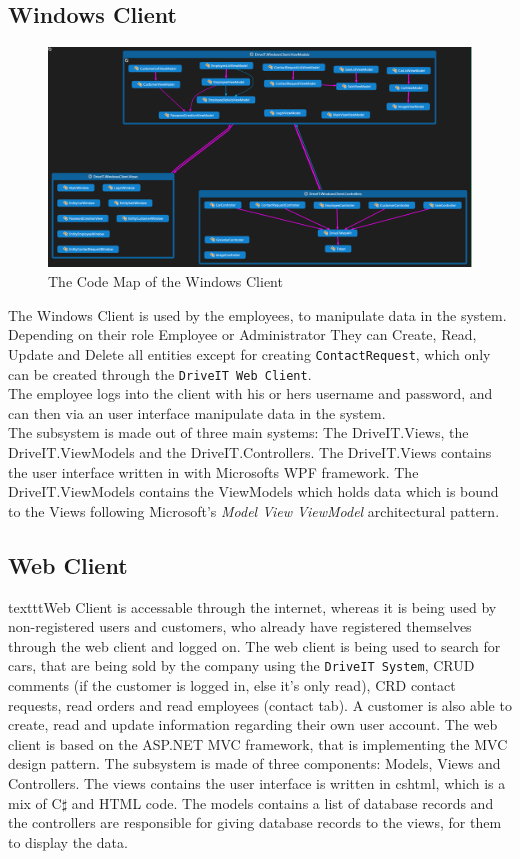 \subsection{Windows Client} 
\begin{figure}[H]
	\centering
	\includegraphics[scale=0.35]{Figures/WindowsClientCodeMap}
	\caption{The Code Map of the Windows Client}
	\label{fig:WindowsClientCodeMap}
\end{figure}
The Windows Client is used by the employees, to manipulate data in the system. Depending on their role Employee or Administrator They can Create, Read, Update and Delete all entities except for creating \texttt{ContactRequest}, which only can be created through the \texttt{DriveIT Web Client}.\\
The employee logs into the client with his or hers username and password, and can then via an user interface manipulate data in the system.\\
The subsystem is made out of three main systems: The DriveIT.Views, the DriveIT.ViewModels and the DriveIT.Controllers. The DriveIT.Views contains the user interface written in with Microsofts WPF framework. The DriveIT.ViewModels contains the ViewModels which holds data which is bound to the Views following Microsoft's \emph{Model View ViewModel} architectural pattern.

\subsection{Web Client}
\The texttt{Web Client} is accessable through the internet, whereas it is being used by non-registered users and customers, who already have registered themselves through the web client and logged on. The web client is being used to search for cars, that are being sold by the company using the \texttt{DriveIT System}, CRUD comments (if the customer is logged in, else it's only read), CRD contact requests, read orders and read employees (contact tab). A customer is also able to create, read and update information regarding their own user account.
The web client is based on the ASP.NET MVC framework, that is implementing the MVC design pattern. The subsystem is made of three components: Models, Views and Controllers. The views contains the user interface is written in cshtml, which is a mix of C$\sharp$ and HTML code. The models contains a list of database records and the controllers are responsible for giving database records to the views, for them to display the data.

